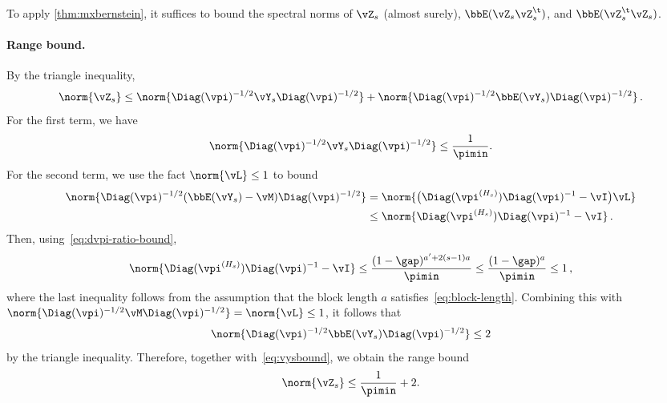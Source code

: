 To apply \cref{thm:mxbernstein}, it suffices to bound the spectral
norms of $\vZ_s$ (almost surely), $\bbE(\vZ_s \vZ_s^\t)$, and
$\bbE(\vZ_s^\t \vZ_s)$.

\paragraph{Range bound.}
By the triangle inequality,
\[
  \norm{\vZ_s}
  \leq \norm{\Diag(\vpi)^{-1/2} \vY_s \Diag(\vpi)^{-1/2}}
  + \norm{\Diag(\vpi)^{-1/2} \bbE(\vY_s) \Diag(\vpi)^{-1/2}}
  \,.
\]
For the first term, we have
\begin{align}
\label{eq:vysbound}
  \norm{\Diag(\vpi)^{-1/2} \vY_s \Diag(\vpi)^{-1/2}} \leq \frac1{\pimin} .
\end{align}
For the second term, we use the fact $\norm{\vL}\le 1$ to bound
\begin{align*}
  \norm{\Diag(\vpi)^{-1/2} (\bbE(\vY_s) -\vM)\Diag(\vpi)^{-1/2}}
  & = \norm{ \bigl(\Diag(\vpi^{(H_s)}) \Diag(\vpi)^{-1} - \vI  \bigr) \vL }
  \\
  & \le \norm{ \Diag(\vpi^{(H_s)}) \Diag(\vpi)^{-1} - \vI }\,.
\end{align*}
Then, using~\cref{eq:dvpi-ratio-bound},
\begin{equation}
  \norm{ \Diag(\vpi^{(H_s)}) \Diag(\vpi)^{-1} - \vI }
  \le \frac{(1-\gap)^{a'+2(s-1)a}}{\pimin}
  \le \frac{(1-\gap)^{a}}{\pimin} \le 1\,,
  \label{eq:ysbias}
\end{equation}
where the last inequality follows from the assumption that the
block length $a$ satisfies~\cref{eq:block-length}.
Combining this with
$\norm{\Diag(\vpi)^{-1/2} \vM\Diag(\vpi)^{-1/2}} = \norm{\vL}\le 1$,
it follows that
\begin{align}
\label{eq:evysbound}
\norm{\Diag(\vpi)^{-1/2} \bbE(\vY_s) \Diag(\vpi)^{-1/2}} \le 2
\end{align}
by the triangle inequality.
Therefore, together with~\cref{eq:vysbound}, we obtain the range bound
\[
  \norm{\vZ_s} \leq \frac1{\pimin} + 2
  .
\]

